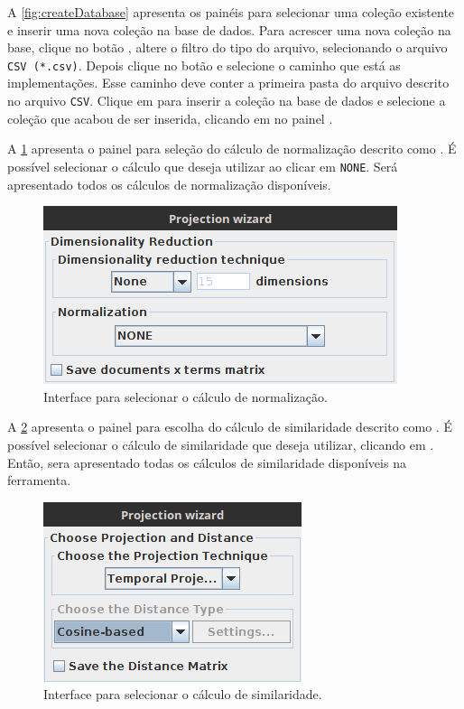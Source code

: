 		A \cref{fig:createDatabase} apresenta os painéis para selecionar uma coleção existente
		e inserir uma nova coleção na base de dados. Para acrescer uma nova coleção na base,
		clique no botão , altere o filtro do tipo do arquivo, selecionando
		o arquivo \texttt{CSV (*.csv)}. Depois clique no botão  e selecione
		o caminho que está as implementações. Esse caminho deve conter a primeira pasta do
		arquivo descrito no arquivo \texttt{CSV}. Clique em  para inserir a
		coleção na base de dados e selecione a coleção que acabou de ser inserida, clicando
		em  no painel .
		
		A \cref{fig:normalizacao} apresenta o painel para seleção do cálculo de normalização
		descrito como . É possível selecionar o cálculo que deseja
		utilizar ao clicar em \texttt{NONE}. Será apresentado todos os cálculos de
		normalização disponíveis.
		
		\begin{figure}
			\centering
			\includegraphics[width=0.45\linewidth]{imagem/normalizacao}
			\caption{Interface para selecionar o cálculo de normalização.}
			\label{fig:normalizacao}
		\end{figure}
		
		A \cref{fig:similaridade} apresenta o painel para escolha do cálculo de similaridade
		descrito como . É possível selecionar o cálculo de
		similaridade que deseja utilizar, clicando em . Então, sera
		apresentado todas os cálculos de similaridade disponíveis na ferramenta.
		
		\begin{figure}
			\centering
			\includegraphics[width=0.32\linewidth]{imagem/similaridade}
			\caption{Interface para selecionar o cálculo de similaridade.}
			\label{fig:similaridade}
		\end{figure}
		
